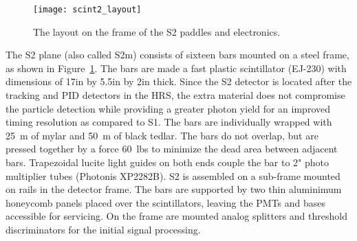 \begin{figure}[tbh]
  \begin{center}
    \texttt{[image: scint2\_layout]}
    \caption[Detectors: S2 Layout]{The layout on the frame of the S2 paddles and
    electronics.}
    \label{fig:s2layout}
  \end{center}
\end{figure}
The S2 plane (also called S2m) consists of sixteen bars mounted on a steel
frame, as shown in Figure~\ref{fig:s2layout}. The bars are made a fast
plastic scintillator (EJ-230) with dimensions of 17\unit{in} by
5.5\unit{in} by 2\unit{in} thick. Since the S2 detector is located after
the tracking and PID 
detectors in the HRS, the extra material does not compromise the particle
detection while providing a greater photon yield for an improved timing
resolution as compared to S1. The bars are individually wrapped with
25\unit{\mu m} of mylar and 50\unit{\mu m} of black tedlar. The bars do not
overlap, but are pressed together by a force 60~lbs to minimize the dead
area between adjacent bars. Trapezoidal lucite light guides on both ends
couple the bar to 2" photo multiplier tubes (Photonis XP2282B). S2 is
assembled on a sub-frame mounted on rails in the detector frame. The bars
are supported by two thin aluminimum honeycomb panels placed over the
scintillators, leaving the PMTs and bases accessible for servicing. On the
frame are mounted analog splitters and threshold discriminators for the
initial signal processing.

